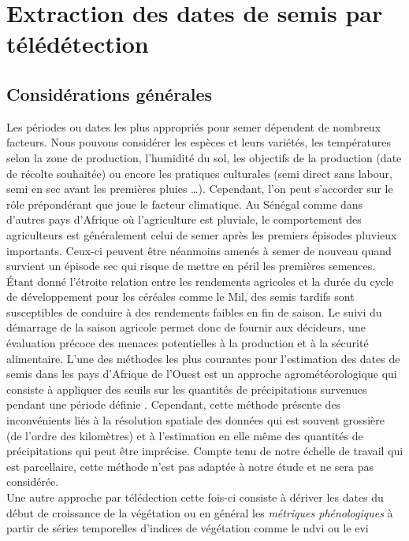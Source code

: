 \section{Extraction des dates de semis par télédétection}
  
  \subsection{Considérations générales} \label{general}
  
Les périodes ou dates les plus appropriés pour semer dépendent de nombreux facteurs.  Nous pouvons considérer les espèces et leurs variétés, les températures 
selon la zone de production, l'humidité du sol, les objectifs de la production (date de récolte souhaitée) ou encore les pratiques culturales (semi direct sans labour, semi en sec avant les premières pluies \ldots{}). Cependant, l'on peut
s'accorder sur le rôle prépondérant que joue le facteur climatique. Au Sénégal comme dans d'autres pays d'Afrique où l'agriculture est pluviale, le comportement des agriculteurs est
généralement celui de semer après les premiers épisodes pluvieux importants. Ceux-ci peuvent être néanmoins amenés à semer de nouveau quand survient un épisode sec qui risque de
mettre en péril les premières semences.\\ \'Etant donné l'étroite relation entre les rendements agricoles et la durée du cycle de développement pour les céréales comme le Mil, 
des semis tardifs sont susceptibles de 
conduire à des rendements faibles en fin de saison. Le suivi du démarrage de la saison agricole permet donc de fournir aux décideurs, une évaluation précoce des menaces potentielles 
à la production et à la sécurité alimentaire. L'une des méthodes les plus courantes pour l'estimation des dates de semis dans les pays d'Afrique de l'Ouest est un approche agrométéorologique 
qui consiste à appliquer des seuils sur les quantités de précipitations survenues pendant une période définie \citep{Marinho2014}. Cependant, cette méthode présente des inconvénients liés 
à la résolution spatiale des données qui est souvent grossière (de l'ordre des kilomètres) et à l'estimation en elle même des quantités de précipitations qui peut être imprécise. 
Compte tenu de notre échelle de travail qui est parcellaire, cette méthode n'est pas adaptée à notre étude et ne sera pas considérée. \\Une autre approche par télédection cette fois-ci
consiste à dériver les dates du début de croissance de la végétation ou en général les \emph{métriques phénologiques} à partir de séries temporelles d'indices de végétation comme le \acrshort{ndvi} ou le \acrshort{evi} 
